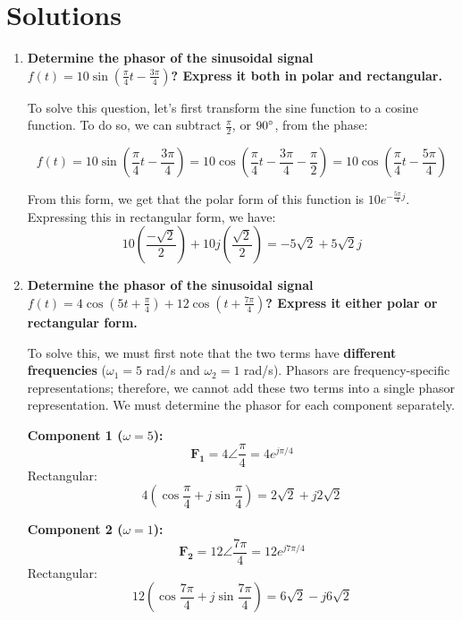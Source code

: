 \documentclass[12pt,letterpaper, onecolumn]{exam}
\begin{document}
\section*{Solutions}
\begin{enumerate}

    \item \textbf{Determine the phasor of the sinusoidal signal $f(t) = 10\sin{(\frac{\pi}{4}t - \frac{3\pi}{4})}$? Express it both in polar and rectangular.}

        To solve this question, let's first transform the sine function to a cosine function. To do so, we can subtract $\frac{\pi}{2}$, or $90\degree$, from the phase:
    
        \[
            f(t) = 10\sin{\left(\frac{\pi}{4}t - \frac{3\pi}{4}\right)} =
            10\cos{\left(\frac{\pi}{4}t - \frac{3\pi}{4} - \frac{\pi}{2}\right)}
            = 10\cos{\left(\frac{\pi}{4}t - \frac{5\pi}{4}\right)}
        \]
    
        From this form, we get that the polar form of this function is $10e^{-\frac{5\pi}{4}j}$. Expressing this in rectangular form, we have:
        \[
            10 \left( \frac{-\sqrt{2}}{2} \right) + 10j \left( \frac{\sqrt{2}}{2} \right) = -5\sqrt{2} + 5\sqrt{2}j
        \]

    \item \textbf{Determine the phasor of the sinusoidal signal $f(t) = 4\cos{(5t + \frac{\pi}{4})} + 12\cos{(t + \frac{7\pi}{4})}$? Express it either polar or rectangular form.}

        To solve this, we must first note that the two terms have \textbf{different frequencies} ($\omega_1 = 5$ rad/s and $\omega_2 = 1$ rad/s). Phasors are frequency-specific representations; therefore, we cannot add these two terms into a single phasor representation. We must determine the phasor for each component separately.

        \textbf{Component 1 ($\omega = 5$):}
        \[
            \mathbf{F_1} = 4\angle{\frac{\pi}{4}} = 4e^{j\pi/4}
        \]
        Rectangular: 
        \[
            4\left(\cos\frac{\pi}{4} + j\sin\frac{\pi}{4}\right) = 2\sqrt{2} + j2\sqrt{2}
        \]

        \textbf{Component 2 ($\omega = 1$):}
        \[
            \mathbf{F_2} = 12\angle{\frac{7\pi}{4}} = 12e^{j7\pi/4}
        \]
        Rectangular: 
        \[
            12\left(\cos\frac{7\pi}{4} + j\sin\frac{7\pi}{4}\right) = 6\sqrt{2} - j6\sqrt{2}
        \]
        

\end{enumerate}
\end{document}
